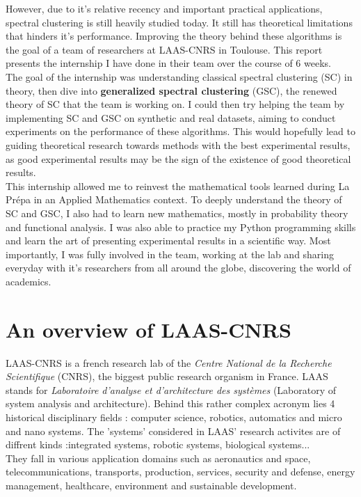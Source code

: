 \documentclass[a4paper,12pt]{article}
\theoremstyle{definition}
\theoremstyle{plain}
\begin{document}
However, due to it's relative recency and important practical applications, spectral clustering is still heavily studied today. It still has theoretical limitations that hinders it's performance. Improving the theory behind these algorithms is the goal of a team of researchers at LAAS-CNRS in Toulouse. This report presents the internship I have done in their team over the course of 6 weeks.\\
The goal of the internship was understanding classical spectral clustering (SC) in theory, then dive into \textbf{generalized spectral clustering} (GSC), the renewed theory of SC that the team is working on. I could then try helping the team by implementing SC and GSC on synthetic and real datasets, aiming to conduct experiments on the performance of these algorithms. This would hopefully lead to guiding theoretical research towards methods with the best experimental results, as good experimental results may be the sign of the existence of good theoretical results. \\
This internship allowed me to reinvest the mathematical tools learned during La Prépa in an Applied Mathematics context. To deeply understand the theory of SC and GSC, I also had to learn new mathematics, mostly in probability theory and functional analysis. I was also able to practice my Python programming skills and learn the art of presenting experimental results in a scientific way.
Most importantly, I was fully involved in the team, working at the lab and sharing everyday with it's researchers from all around the globe, discovering the world of academics.

\section{An overview of LAAS-CNRS}
LAAS-CNRS is a french research lab of the \textit{Centre National de la Recherche Scientifique} (CNRS), the biggest public research organism in France.
LAAS stands for \textit{Laboratoire d'analyse et d'architecture des systèmes} (Laboratory of system analysis and architecture). Behind this rather complex acronym lies 4 historical disciplinary fields : computer science, robotics, automatics and micro and nano systems.
The 'systems' considered in LAAS' research activites are of diffrent kinds :integrated systems, robotic systems, biological systems... \\
They fall in various application domains such as aeronautics and space, telecommunications, transports, production, services, security and defense, energy management, healthcare, environment and sustainable development.
\end{document}
